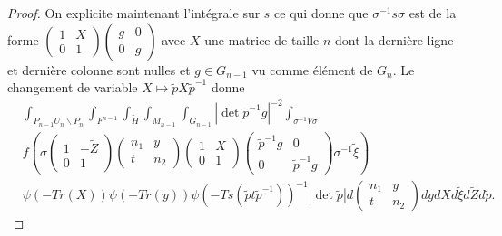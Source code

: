 \documentclass{amsart}
\begin{document}
\begin{proof}
On explicite maintenant l'intégrale sur $s$ ce qui donne que $\sigma^{-1}s \sigma$ est de la forme $\begin{pmatrix}
1 & X \\
0 & 1
\end{pmatrix} \begin{pmatrix}
g & 0 \\
0 & g
\end{pmatrix}$ avec $X$ une matrice de taille $n$ dont la dernière ligne et dernière colonne sont nulles et $g \in G_{n-1}$ vu comme élément de $G_n$.
Le changement de variable $X \mapsto \tilde{p}X\tilde{p}^{-1}$ donne
\begin{equation}
\begin{split}
& \int_{P_{n-1}U_n\backslash{P_n}} \int_{F^{n-1}} \int_{\tilde{H}} \int_{M_{n-1}} \int_{G_{n-1}}  |\det \tilde{p}^{-1}g|^{-2}\int_{\sigma^{-1}V\sigma} \\
& f\left(\sigma \begin{pmatrix}
1 & -\tilde{Z} \\
0 & 1
\end{pmatrix}  \begin{pmatrix}
n_1 & y \\
t & n_2
\end{pmatrix} \begin{pmatrix}
1 & X \\
0 & 1
\end{pmatrix} \begin{pmatrix}
\tilde{p}^{-1} g & 0 \\
0 & \tilde{p}^{-1} g
\end{pmatrix} \sigma^{-1} \tilde{\xi}\right) \\
& \psi(-Tr(X)) \psi(-Tr(y)) \psi(-Ts(\tilde{p}t\tilde{p}^{-1}))^{-1}  |\det \tilde{p}| d\begin{pmatrix}
n_1 & y \\
t & n_2
\end{pmatrix} dg dX d\tilde{\xi} d\tilde{Z} d\tilde{p}.
\end{split}
\end{equation}


\end{proof}
\end{document}
